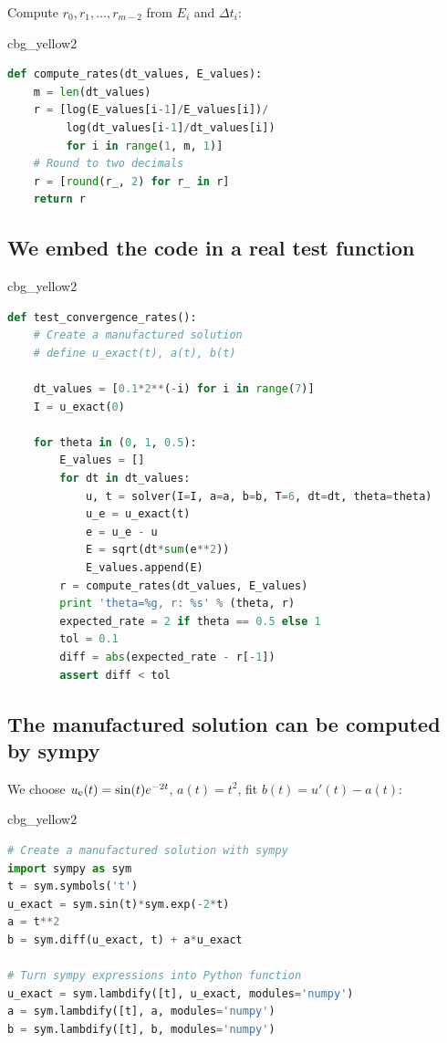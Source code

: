 \documentclass[%
oneside,                 %
final,                   %
10pt]{article}
\newenvironment{_cod_tight}[1]{
   \def\FrameCommand{\colorbox{#1}}
   \FrameRule0.6pt\MakeFramed {\FrameRestore}\vskip3mm}
   {\vskip0mm\endMakeFramed}
\newenvironment{cod}[1]{
\bgroup\rmfamily
\fboxsep=0mm\relax
\begin{_cod_tight}{#1}
\list{}{\parsep=-2mm\parskip=0mm\topsep=0pt\leftmargin=2mm
\rightmargin=2\leftmargin\leftmargin=4pt\relax}
\item\relax}
{\endlist\end{_cod_tight}\egroup}
\begin{document}
Compute $r_0, r_1, \ldots, r_{m-2}$ from $E_i$ and $\Delta t_i$:

\begin{cod}{cbg_yellow2}\begin{lstlisting}[language=Python,style=simple,xleftmargin=2mm]
def compute_rates(dt_values, E_values):
    m = len(dt_values)
    r = [log(E_values[i-1]/E_values[i])/
         log(dt_values[i-1]/dt_values[i])
         for i in range(1, m, 1)]
    # Round to two decimals
    r = [round(r_, 2) for r_ in r]
    return r
\end{lstlisting}\end{cod}
\noindent

\subsection*{We embed the code in a real test function}

\begin{cod}{cbg_yellow2}\begin{lstlisting}[language=Python,style=simple,xleftmargin=2mm]
def test_convergence_rates():
    # Create a manufactured solution
    # define u_exact(t), a(t), b(t)

    dt_values = [0.1*2**(-i) for i in range(7)]
    I = u_exact(0)

    for theta in (0, 1, 0.5):
        E_values = []
        for dt in dt_values:
            u, t = solver(I=I, a=a, b=b, T=6, dt=dt, theta=theta)
            u_e = u_exact(t)
            e = u_e - u
            E = sqrt(dt*sum(e**2))
            E_values.append(E)
        r = compute_rates(dt_values, E_values)
        print 'theta=%g, r: %s' % (theta, r)
        expected_rate = 2 if theta == 0.5 else 1
        tol = 0.1
        diff = abs(expected_rate - r[-1])
        assert diff < tol
\end{lstlisting}\end{cod}
\noindent

\subsection*{The manufactured solution can be computed by sympy}

We choose $\uex(t) = \sin(t)e^{-2t}$, $a(t)=t^2$, fit $b(t)=u'(t)-a(t)$:

\begin{cod}{cbg_yellow2}\begin{lstlisting}[language=Python,style=simple,xleftmargin=2mm]
# Create a manufactured solution with sympy
import sympy as sym
t = sym.symbols('t')
u_exact = sym.sin(t)*sym.exp(-2*t)
a = t**2
b = sym.diff(u_exact, t) + a*u_exact

# Turn sympy expressions into Python function
u_exact = sym.lambdify([t], u_exact, modules='numpy')
a = sym.lambdify([t], a, modules='numpy')
b = sym.lambdify([t], b, modules='numpy')
\end{lstlisting}\end{cod}
\noindent
\end{document}

